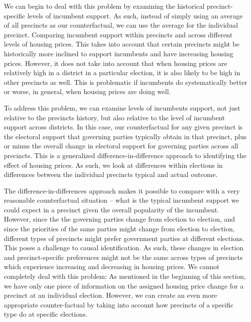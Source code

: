 \documentclass[12pt,a4paper]{article}
\begin{document}
	We can begin to deal with this problem by examining the historical precinct-specific levels of incumbent support. As such, instead of simply using an average of all precincts as our counterfactual, we can use the average for the individual precinct. Comparing incumbent support within precincts and across different levels of housing prices. This takes into account that certain precincts might be historically more inclined to support incumbents and have increasing housing prices. However, it does not take into account that when housing prices are relatively high in a district in a particular election, it is also likely to be high in other precincts as well. This is problematic if incumbents do systematically better or worse, in general, when housing prices are doing well.
	
	To address this problem, we can examine levels of incumbents support, not just relative to the precincts history, but also relative to the level of incumbent support across districts. In this case, our counterfactual for any given precinct is the electoral support that governing parties typically obtain in that precinct, plus or minus the overall change in electoral support for governing parties across all precincts. This is a generalized difference-in-difference approach to identifying the effect of housing prices. As such, we look at differences within elections in differences between the individual precincts typical and actual outcome.
	
	The difference-in-differences approach makes it possible to compare with a very reasonable counterfactual situation -- what is the typical incumbent support we could expect in a precinct given the overall popularity of the incumbent. However, since the the governing parties change from election to election, and since the priorities of the same parties might change from election to election, different types of precincts might prefer government parties at  different elections. This poses a challenge to causal identification. As such,  these changes in election and precinct-specific preferences might not be the same across types of precincts which experience increasing and decreasing in housing prices. We cannot completely deal with this problem: As mentioned in the beginning of this section, we have only one piece of information on the assigned housing price change for a precinct at an individual election. However, we can create an even more appropriate counter-factual by taking into account how precincts of a specific type do at specific elections.
	
\end{document}
